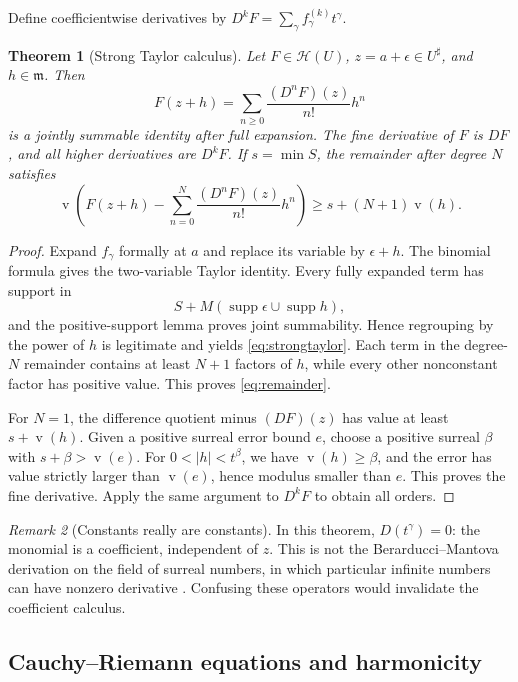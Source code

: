 \documentclass[11pt,letterpaper]{article}
\numberwithin{equation}{section}
\newtheorem{theorem}{Theorem}[section]
\theoremstyle{definition}
\theoremstyle{remark}
\newtheorem{remark}[theorem]{Remark}
\newcommand{\mm}{\mathfrak{m}}
\newcommand{\HH}{\mathcal{H}}
\newcommand{\supp}{\operatorname{supp}}
\newcommand{\val}{\operatorname{v}}
\begin{document}
Define coefficientwise derivatives by
$D^kF=\sum_\gamma f_\gamma^{(k)}t^\gamma$.

\begin{theorem}[Strong Taylor calculus]\label{thm:taylor}
Let $F\in\HH(U)$, $z=a+\epsilon\in U^\sharp$, and $h\in\mm$. Then
\begin{equation}\label{eq:strongtaylor}
 F(z+h)=\sum_{n\ge0}\frac{(D^nF)(z)}{n!}h^n
\end{equation}
is a jointly summable identity after full expansion. The fine derivative of
$F$ is $DF$, and all higher derivatives are $D^kF$.
If $s=\min S$, the remainder after degree $N$ satisfies
\begin{equation}\label{eq:remainder}
 \val\left(F(z+h)-\sum_{n=0}^{N}\frac{(D^nF)(z)}{n!}h^n\right)
 \ge s+(N+1)\val(h).
\end{equation}
\end{theorem}
\begin{proof}
Expand $f_\gamma$ formally at $a$ and replace its variable by
$\epsilon+h$. The binomial formula gives the two-variable Taylor identity.
Every fully expanded term has support in
\[
 S+M(\supp\epsilon\cup\supp h),
\]
and the positive-support lemma proves joint summability. Hence regrouping by
the power of $h$ is legitimate and yields \eqref{eq:strongtaylor}.
Each term in the degree-$N$ remainder contains at least $N+1$ factors of $h$,
while every other nonconstant factor has positive value. This proves
\eqref{eq:remainder}.

For $N=1$, the difference quotient minus $(DF)(z)$ has value at least
$s+\val(h)$. Given a positive surreal error bound $e$, choose a positive
surreal $\beta$ with $s+\beta>\val(e)$. For $0<|h|<t^\beta$, we have
$\val(h)\ge\beta$, and the error has value strictly larger than $\val(e)$,
hence modulus smaller than $e$. This proves the fine derivative. Apply the
same argument to $D^kF$ to obtain all orders.
\end{proof}

\begin{remark}[Constants really are constants]
In this theorem, $D(t^\gamma)=0$: the monomial is a coefficient, independent
of $z$. This is not the Berarducci--Mantova derivation on the field of surreal
numbers, in which particular infinite numbers can have nonzero derivative
\cite{BMderivations}. Confusing these operators would invalidate the
coefficient calculus.
\end{remark}

\subsection{Cauchy--Riemann equations and harmonicity}
\end{document}
